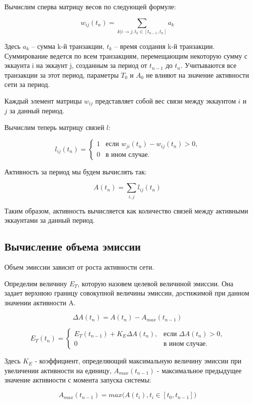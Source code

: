 \documentclass[a4paper,12pt]{article}
\begin{document}
Вычислим сперва матрицу весов по следующей формуле:

$$
w_{ij}(t_n)=\sum_{k|i \to j, t_k \in [t_{n-1}, t_n]}a_k
$$

Здесь $a_k$ – сумма k-й транзакции, $t_k$ – время создания k-й транзакции. Суммирование ведется по всем транзакциям, перемещающим некоторую сумму с эккаунта i на эккаунт j, созданным за период от $t_{n-1}$ до $t_n$. Учитываются все транзакции за этот период, параметры $T_0$ и $A_0$ не влияют на значение активности сети за период.

Каждый элемент матрицы $w_{ij}$ представляет собой вес связи между эккаунтом $i$ и $j$ за данный период.

Вычислим теперь матрицу связей $l$:

$$
l_{ij}(t_n) = \begin{cases}
 1
 & \text{если $w_{ji}(t_n)-w_{ij}(t_n) > 0$,}\\
 0 & \text{в ином случае.}
\end{cases}
$$

Активность за период мы будем вычислять так:

$$
A(t_n) = \sum_{i,j} l_{ij}(t_n)
$$

Таким образом, активность вычисляется как количество связей между активными эккаунтами за данный период.

\subsection{Вычисление объема эмиссии}

Объем эмиссии зависит от роста активности сети.

Определим величину $E_T$, которую назовем целевой величиной эмиссии. Она задает верхнюю границу совокупной величины эмиссии, достижимой при данном значении активности A.

$$
\Delta A(t_n) = A(t_n) - A_{max}(t_{n-1})
$$

$$
E_T(t_n) = \begin{cases}
 E_T(t_{n-1}) + K_E \Delta A(t_n),
 & \text{если $\Delta A(t_n) > 0$,}\\
 0 & \text{в ином случае.}
\end{cases}
$$

Здесь $K_E$ - коэффициент, определяющий максимальную величину эмиссии при увеличении активности на единицу, $A_{max}(t_{n-1})$ - максимальное предыдущее значение активности с момента запуска системы:

$$
    A_{max}(t_{n-1}) = max \Big ( A(t_i), t_i \in [t_0, t_{n-1}] \Big )
$$
\end{document}
